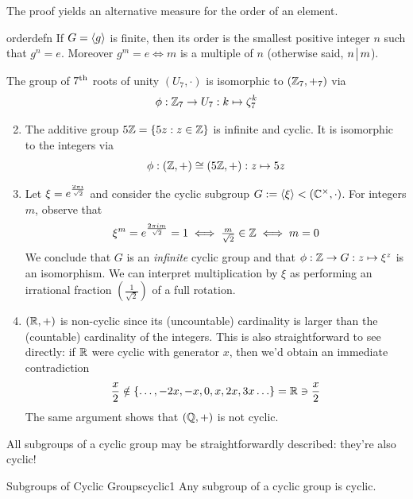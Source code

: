
The proof yields an alternative measure for the order of an element.



\begin{cor}{}{orderdefn}
	If $G=\left\langle g\right\rangle$ is finite, then its order is the smallest positive integer $n$ such that $g^n=e$. Moreover $g^m=e\Longleftrightarrow m$ is a multiple of $n$ (otherwise said, $n\!\bigm|\!m$).
\end{cor}


\goodbreak

\begin{examples}{}{}
	\exstart The group of $7\textsuperscript{th}$ roots of unity $(U_7,\cdot)$ is isomorphic to $(\mathbb{Z}_7,+_7)$ via
	\[
		\phi:\mathbb{Z}_7\to U_7:k\mapsto \zeta_7^k
	\]
	\begin{enumerate}\setcounter{enumi}{1}
	  \item The additive group $5\mathbb{Z}=\{5z:z\in\mathbb{Z}\}$ is infinite and cyclic. It is isomorphic to the integers via
		\[
			\phi:(\mathbb{Z},+)\cong(5\mathbb{Z},+):z\mapsto 5z
		\]
	  
		\item Let $\xi=\smash[t]{e^{\frac{2\pi i}{\sqrt 2}}}$ and consider the cyclic subgroup $G:=\left\langle \xi\right\rangle<(\mathbb{C}^\times,\cdot)$. For integers $m$, observe that
		\[
			\xi^m=e^{\frac{2\pi im}{\sqrt 2}}=1\iff \tfrac m{\sqrt 2}\in\mathbb{Z}\iff m=0
		\]
		We conclude that $G$ is an \emph{infinite} cyclic group and that $\phi:\mathbb{Z}\to G:z\mapsto\xi^z$ is an isomorphism. We can interpret multiplication by $\xi$ as performing an irrational fraction $(\frac 1{\sqrt 2})$ of a full rotation.
		
		\item $(\mathbb{R},+)$ is non-cyclic since its (uncountable) cardinality is larger than the (countable) cardinality of the integers. This is also straightforward to see directly: if $\mathbb{R}$ were cyclic with generator $x$, then we'd obtain an immediate contradiction
		\[
			\frac x2\notin\{\ldots,-2x,-x,0,x,2x,3x\ldots\}=\mathbb{R}\ni\frac x2
		\]
		The same argument shows that $(\mathbb{Q},+)$ is not cyclic.
	\end{enumerate}
\end{examples}

\bigskip


All subgroups of a cyclic group may be straightforwardly described: they're also cyclic!

\begin{thm}{Subgroups of Cyclic Groups}{cyclic1}
	Any subgroup of a cyclic group is cyclic.
\end{thm}

